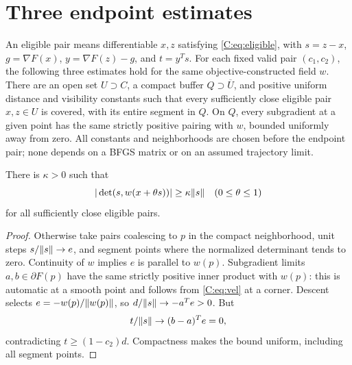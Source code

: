 \setcounter{section}{4}
\setcounter{theorem}{4}
\setcounter{equation}{12}
\section{Three endpoint estimates}
An eligible pair means differentiable $x,z$ satisfying \eqref{C:eq:eligible}, with $s=z-x$, $g=\nabla F(x)$, $y=\nabla F(z)-g$, and $t=y^Ts$. For each fixed valid pair $(c_1,c_2)$, the following three estimates hold for the same objective-constructed field $w$. There are an open set $U\supset C$, a compact buffer $Q\supset\overline U$, and positive uniform distance and visibility constants such that every sufficiently close eligible pair $x,z\in U$ is covered, with its entire segment in $Q$. On $Q$, every subgradient at a given point has the same strictly positive pairing with $w$, bounded uniformly away from zero. All constants and neighborhoods are chosen before the endpoint pair; none depends on a BFGS matrix or on an assumed trajectory limit.

\begin{lemma}\label{C:lem:trans}
There is $\kappa>0$ such that
\[
 |\det(s,w(x+\theta s))|\ge\kappa\lVert s\rVert
 \quad(0\le\theta\le1)
\]
for all sufficiently close eligible pairs.
\end{lemma}
\begin{proof}
Otherwise take pairs coalescing to $p$ in the compact neighborhood, unit steps $s/\lVert s\rVert\to e$, and segment points where the normalized determinant tends to zero. Continuity of $w$ implies $e$ is parallel to $w(p)$. Subgradient limits $a,b\in\partial F(p)$ have the same strictly positive inner product with $w(p)$: this is automatic at a smooth point and follows from \eqref{C:eq:vel} at a corner. Descent selects $e=-w(p)/\lVert w(p)\rVert$, so $d/\lVert s\rVert\to-a^Te>0$. But
\[
 t/\lVert s\rVert\to(b-a)^Te=0,
\]
contradicting $t\ge(1-c_2)d$. Compactness makes the bound uniform, including all segment points.
\end{proof}

